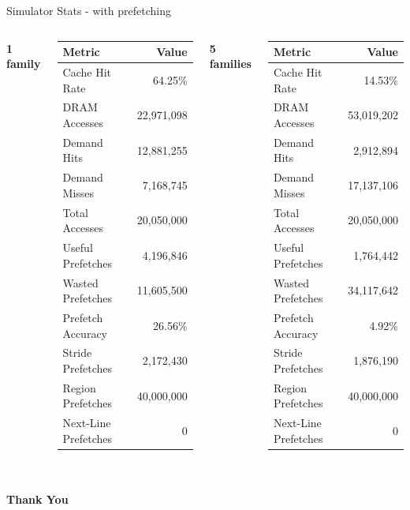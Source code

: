 \documentclass[Serif, 10pt, brown]{beamer}
\theoremstyle{example}
\theoremstyle{plain}
\begin{document}
\begin{frame}{Simulator Stats - with prefetching}
\begin{columns}
    \centering
    \textbf{1 family}
    
    \vspace{2mm}
    
    {\scriptsize \begin{tabular}{|l|r|}
        \hline
        Metric & Value \\
        \hline
        Cache Hit Rate & 64.25\% \\
        DRAM Accesses & 22,971,098 \\
        Demand Hits & 12,881,255 \\
        Demand Misses & 7,168,745 \\
        Total Accesses & 20,050,000 \\
        Useful Prefetches & 4,196,846 \\
        Wasted Prefetches & 11,605,500 \\
        Prefetch Accuracy & 26.56\% \\
        Stride Prefetches & 2,172,430 \\
        Region Prefetches & 40,000,000 \\
        Next-Line Prefetches & 0 \\
        \hline
    \end{tabular}}

    \centering
    \textbf{5 families}
    
    \vspace{2mm}
    
    {\scriptsize \begin{tabular}{|l|r|}
        \hline
        Metric & Value \\
        \hline
        Cache Hit Rate & 14.53\% \\
        DRAM Accesses & 53,019,202 \\
        Demand Hits & 2,912,894 \\
        Demand Misses & 17,137,106 \\
        Total Accesses & 20,050,000 \\
        Useful Prefetches & 1,764,442 \\
        Wasted Prefetches & 34,117,642 \\
        Prefetch Accuracy & 4.92\% \\
        Stride Prefetches & 1,876,190 \\
        Region Prefetches & 40,000,000 \\
        Next-Line Prefetches & 0 \\
        \hline
    \end{tabular}}

\end{columns}

\vspace{3mm}

\centering
\small
\end{frame}








\section{}
\begin{frame}
    \Huge{\centerline{\bf Thank You}}
\end{frame}
\end{document}

